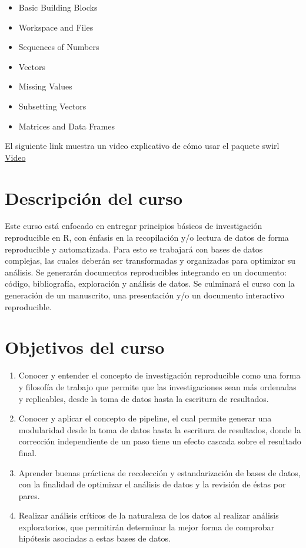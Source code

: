 \documentclass[]{book}
\providecommand{\tightlist}{%
  \setlength{\itemsep}{0pt}\setlength{\parskip}{0pt}}
\begin{document}
\begin{itemize}
\tightlist
\item
  Basic Building Blocks
\item
  Workspace and Files
\item
  Sequences of Numbers
\item
  Vectors
\item
  Missing Values
\item
  Subsetting Vectors
\item
  Matrices and Data Frames
\end{itemize}

El siguiente link muestra un video explicativo de cómo usar el paquete
swirl \href{https://youtu.be/w6L7Ye18yPE}{Video}

\hypertarget{descripcion-del-curso}{%
\section{Descripción del curso}\label{descripcion-del-curso}}

Este curso está enfocado en entregar principios básicos de investigación
reproducible en R, con énfasis en la recopilación y/o lectura de datos
de forma reproducible y automatizada. Para esto se trabajará con bases
de datos complejas, las cuales deberán ser transformadas y organizadas
para optimizar su análisis. Se generarán documentos reproducibles
integrando en un documento: código, bibliografía, exploración y análisis
de datos. Se culminará el curso con la generación de un manuscrito, una
presentación y/o un documento interactivo reproducible.

\hypertarget{objetivos-del-curso}{%
\section{Objetivos del curso}\label{objetivos-del-curso}}

\begin{enumerate}
\def\labelenumi{\arabic{enumi}.}
\item
  Conocer y entender el concepto de investigación reproducible como una
  forma y filosofía de trabajo que permite que las investigaciones sean
  más ordenadas y replicables, desde la toma de datos hasta la escritura
  de resultados.
\item
  Conocer y aplicar el concepto de pipeline, el cual permite generar una
  modularidad desde la toma de datos hasta la escritura de resultados,
  donde la corrección independiente de un paso tiene un efecto cascada
  sobre el resultado final.
\item
  Aprender buenas prácticas de recolección y estandarización de bases de
  datos, con la finalidad de optimizar el análisis de datos y la
  revisión de éstas por pares.
\item
  Realizar análisis críticos de la naturaleza de los datos al realizar
  análisis exploratorios, que permitirán determinar la mejor forma de
  comprobar hipótesis asociadas a estas bases de datos.
\end{enumerate}
\end{document}
